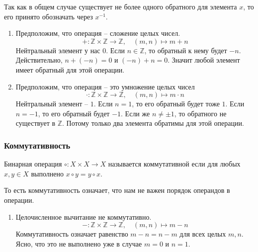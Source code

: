 Так как в общем случае существует не более одного обратного для элемента $x$, то его принято обозначать через $x^{-1}$.

\begin{examples}
\begin{enumerate}
\item Предположим, что операция -- сложение целых чисел.
\[
+\colon \mathbb Z\times \mathbb Z\to \mathbb Z,\quad (m,n)\mapsto m+n
\]
Нейтральный элемент у нас $0$.
Если $n\in \mathbb Z$, то обратный к нему будет $-n$.
Действительно, $n + (-n) = 0$ и $(-n) + n = 0$.
Значит любой элемент имеет обратный для этой операции.

\item Предположим, что операция -- это умножение целых чисел
\[
\cdot\colon \mathbb Z\times \mathbb Z\to \mathbb Z,\quad (m,n)\mapsto m\cdot n
\]
Нейтральный элемент -- $1$.
Если $n = 1$, то его обратный будет тоже $1$.
Если $n = -1$, то его обратный будет $-1$.
Если же $n\neq \pm1$, то обратного не существует в $\mathbb Z$.
Потому только два элемента обратимы для этой операции.
\end{enumerate}
\end{examples}

\subsubsection{Коммутативность}

\begin{definition}
Бинарная операция $\circ \colon X\times X\to X$ называется коммутативной если для любых $x,y\in X$ выполнено $x \circ y = y\circ x$.
\end{definition}

То есть коммутативность означает, что нам не важен порядок операндов в операции.

\begin{examples}
\begin{enumerate}
 сложение коммутативно.
\[
+\colon \mathbb Z\times \mathbb Z\to \mathbb Z,\quad (m,n)\mapsto m+n
\]
Действительно, для любых $m,n\in \mathbb Z$, мы имеем $m + n = n + m$.

\item Целочисленное вычитание не коммутативно.
\[
-\colon \mathbb Z\times \mathbb Z\to \mathbb Z,\quad (m,n)\mapsto m-n
\]
Коммутативность означает равенство $m - n = n - m$ для всех целых $m,n$.
Ясно, что это не выполнено уже в случае $m = 0$ и $n = 1$.
\end{enumerate}
\end{examples}

